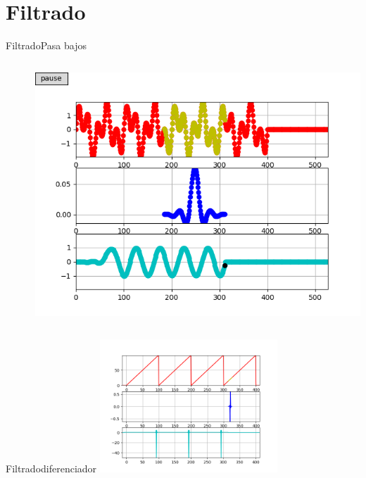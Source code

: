 \section{Filtrado}
\begin{frame}{Filtrado}{Pasa bajos}
   \begin{columns}[c]
      \hspace{5pt}
      \begin{column}{.3\textwidth}
         
      \end{column}
      \hspace{2pt}
      \vrule
      \hspace{2pt}
      \begin{column}{.3\textwidth}
         
      \end{column}
      \hspace{2pt}
      \vrule
      \hspace{2pt}
      \begin{column}{.38\textwidth}
         \centering\includegraphics[width=1.0\textwidth]{4_clase/conv2}
      \end{column}
      \hspace{2pt}
   \end{columns}
   \vfill
\end{frame}
\begin{frame}{Filtrado}{diferenciador}
         \centering\includegraphics[width=0.5\textwidth]{4_clase/diferenciador}
   \vfill
\end{frame}
